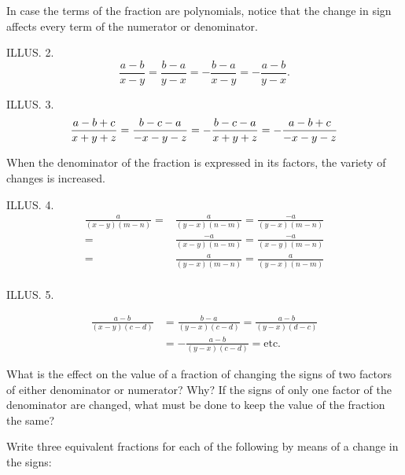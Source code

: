 \documentclass{book}
\begin{document}
In case the terms of the fraction are polynomials, notice that the
change in sign affects every term of the numerator or denominator.

ILLUS. 2.
\[
\frac{a-b}{x-y}=\frac{b-a}{y-x}=-\frac{b-a}{x-y}=-\frac{a-b}{y-x}.
\]

ILLUS. 3.
\[
\frac{a-b+c}{x+y+z}=\frac{b-c-a}{-x-y-z}=-\frac{b-c-a}{x+y+z}\\
=-\frac{a-b+c}{-x-y-z}
\]

When the denominator of the fraction is expressed in its factors,
the variety of changes is increased.

ILLUS. 4.
\begin{align*}
\frac{a}{(x-y)(m-n)} =& \frac{a}{(y-x)(n-m)} = \frac{-a}{(y-x)(m-n)} \\
                     =& \frac{-a}{(x-y)(n-m)} = \frac{-a}{(x-y)(m-n)} \\
                     =& \frac{a}{(y-x)(m-n)} =\frac{a}{(y-x)(n-m)} \\
\end{align*}

ILLUS. 5.

\begin{align*}
\frac{a-b}{(x-y)(c-d)}&= \frac{b-a}{(y-x)(c-d)} = \frac{a-b}{(y-x)(d-c)}\\
&= -\frac{a-b}{(y-x)(c-d)} = \textrm{etc.}
\end{align*}

What is the effect on the value of a fraction of changing the
signs of two factors of either denominator or numerator? Why? If
the signs of only one factor of the denominator are changed, what
must be done to keep the value of the fraction the same?

Write three equivalent fractions for each of the following by
means of a change in the signs:
\end{document}
